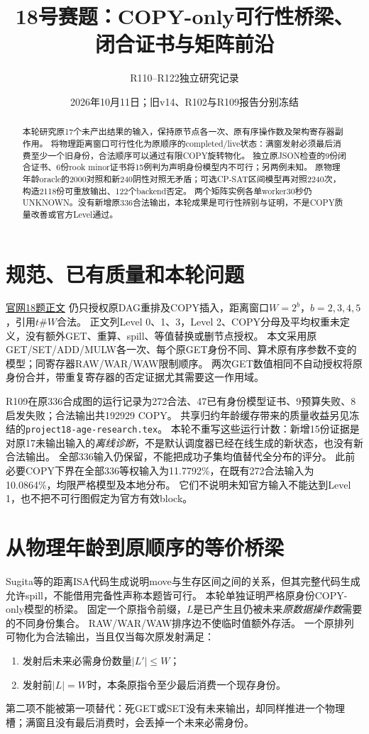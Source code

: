 \documentclass[UTF8,11pt,a4paper]{ctexart}
\title{18号赛题：COPY-only可行性桥梁、闭合证书与矩阵前沿}
\author{R110--R122独立研究记录}
\date{2026年10月11日；旧v14、R102与R109报告分别冻结}
\begin{document}
\maketitle
\begin{abstract}
本轮研究原17个未产出结果的输入，保持原节点各一次、原有序操作数及架构寄存器副作用。
将物理距离窗口可行性化为原顺序的completed/live状态：满窗发射必须最后消费至少一个旧身份，合法顺序可以通过有限COPY旋转物化。
独立原JSON检查的9份闭合证书、6份rook minor证书将15例判为声明身份模型内不可行；另两例未知。
原物理年龄oracle的2000对照和新240阴性对照无矛盾；可选CP-SAT区间模型再对照2240次，构造2118份可重放输出、122个backend否定。
两个矩阵实例各单worker30秒仍UNKNOWN。没有新增原336合法输出，本轮成果是可行性辨别与证明，不是COPY质量改善或官方Level通过。
\end{abstract}

\section{规范、已有质量和本轮问题}
\href{https://www.chaspark.com/\#/races/competitions/1326690549003280384}{官网18题正文}
仍只授权原DAG重排及COPY插入，距离窗口$W=2^b$，$b=2,3,4,5$，引用$t\#W$合法。
正文列Level 0、1、3，Level 2、COPY分母及平均权重未定义，没有额外GET、重算、spill、等值替换或删节点授权。
本文采用原GET/SET/ADD/MULW各一次、每个原GET身份不同、算术原有序参数不变的模型；同寄存器RAW/WAR/WAW限制顺序。
两次GET数值相同不自动授权将原身份合并，带重复寄存器的否定证据尤其需要这一作用域。

R109在原336合成图的运行记录为272合法、47已有身份模型证书、9预算失败、8启发失败；合法输出共192929 COPY。
共享归约年龄缓存带来的质量收益另见冻结的\texttt{project18-age-research.tex}。
本轮不重写这些运行计数：新增15份证据是对原17未输出输入的\emph{离线诊断}，不是默认调度器已经在线生成的新状态，也没有新合法输出。
全部336输入仍保留，不能把成功子集均值替代全分布的评分。
此前必要COPY下界在全部336等权输入为11.7792\%，在既有272合法输入为10.0864\%，均限严格模型及本地分布。
它们不说明未知官方输入不能达到Level 1，也不把不可行图假定为官方有效block。

\section{从物理年龄到原顺序的等价桥梁}
Sugita等的距离ISA代码生成\cite{sugita}说明move与生存区间之间的关系，但其完整代码生成允许spill，不能借用完备性声称本题皆可行。
本轮单独证明严格原身份COPY-only模型的桥梁。
固定一个原指令前缀，$L$是已产生且仍被未来\emph{原数据操作数}需要的不同身份集合。
RAW/WAR/WAW排序边不使临时值额外存活。
一个原排列可物化为合法输出，当且仅当每次原发射满足：
\begin{enumerate}
\item 发射后未来必需身份数量$|L'|\leq W$；
\item 发射前$|L|=W$时，本条原指令至少最后消费一个现存身份。
\end{enumerate}
第二项不能被第一项替代：死GET或SET没有未来输出，却同样推进一个物理槽；满窗且没有最后消费时，会丢掉一个未来必需身份。
\end{document}
